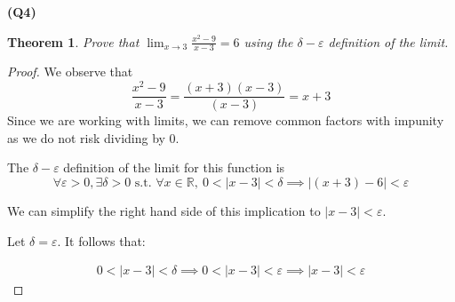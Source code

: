 \documentclass[12pt, a4paper]{article}
\renewcommand{\epsilon}{\varepsilon}
\newcommand{\R}{\mathbb{R}}
\newtheorem{theorem}{Theorem}
\begin{document}
\textbf{(Q4)}
\begin{theorem}
    Prove that $\displaystyle{\lim_{x \to 3} \frac{x^2 - 9}{x - 3}} = 6$ using the $\delta-\epsilon$ definition of the limit.
\end{theorem}

\begin{proof}
    We observe that 
    \[
        \frac{x^2 - 9}{x - 3} = \frac{(x + 3)(x - 3)}{(x - 3)} = x + 3
    \]
    Since we are working with limits, we can remove common factors with impunity as we do not
    risk dividing by 0.

    The $\delta-\epsilon$ definition of the limit for this function is
    \[
        \forall \epsilon > 0, \exists \delta > 0 \text { s.t. } \forall x \in \R, \:
        0 < |x - 3| < \delta \implies |(x + 3) - 6| < \epsilon
    \]

    We can simplify the right hand side of this implication to $|x - 3| < \epsilon$.

    Let $\delta = \epsilon$. It follows that:

    \begin{align*}
        0 < |x - 3| < \delta \implies 0 < |x - 3| < \epsilon \implies |x - 3| < \epsilon
    \end{align*}
\end{proof}
\end{document}

